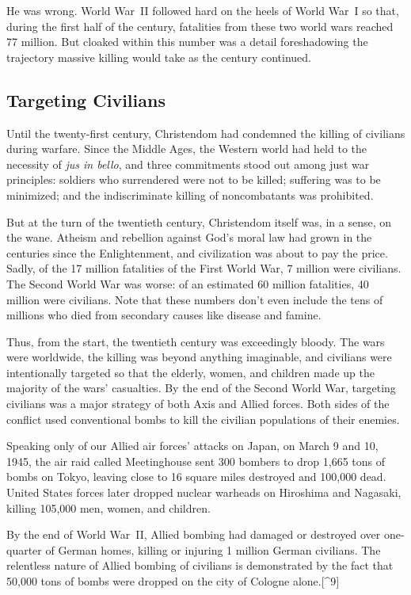 \documentclass[
]{book}
\begin{document}
He was wrong. World War~II followed hard on the heels of World War~I so that, during the first half of the century, fatalities from these two world wars reached 77 million. But cloaked within this number was a detail foreshadowing the trajectory massive killing would take as the century continued.

\hypertarget{targeting-civilians}{%
\subsection{Targeting Civilians}\label{targeting-civilians}}

Until the twenty-first century, Christendom had condemned the killing of civilians during warfare. Since the Middle Ages, the Western world had held to the necessity of \emph{jus in bello}, and three commitments stood out among just war principles: soldiers who surrendered were not to be killed; suffering was to be minimized; and the indiscriminate killing of noncombatants was prohibited.

But at the turn of the twentieth century, Christendom itself was, in a sense, on the wane. Atheism and rebellion against God's moral law had grown in the centuries since the Enlightenment, and civilization was about to pay the price. Sadly, of the 17 million fatalities of the First World War, 7 million were civilians. The Second World War was worse: of an estimated 60 million fatalities, 40 million were civilians. Note that these numbers don't even include the tens of millions who died from secondary causes like disease and famine.

Thus, from the start, the twentieth century was exceedingly bloody. The wars were worldwide, the killing was beyond anything imaginable, and civilians were intentionally targeted so that the elderly, women, and children made up the majority of the wars' casualties. By the end of the Second World War, targeting civilians was a major strategy of both Axis and Allied forces. Both sides of the conflict used conventional bombs to kill the civilian populations of their enemies.

Speaking only of our Allied air forces' attacks on Japan, on March 9 and 10, 1945, the air raid called Meetinghouse sent 300 bombers to drop 1,665 tons of bombs on Tokyo, leaving close to 16 square miles destroyed and 100,000 dead. United States forces later dropped nuclear warheads on Hiroshima and Nagasaki, killing 105,000 men, women, and children.

By the end of World War~II, Allied bombing had damaged or destroyed over one-quarter of German homes, killing or injuring 1 million German civilians. The relentless nature of Allied bombing of civilians is demonstrated by the fact that 50,000 tons of bombs were dropped on the city of Cologne alone.{[}\^{}9{]}
\end{document}
